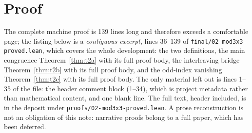 \documentclass[11pt]{article}
\begin{document}
\section{Proof}
The complete machine proof is 139 lines long and therefore exceeds a comfortable page; the
listing below is a \emph{contiguous excerpt}, lines 36--139 of
\texttt{final/02-mod3x3-proved.lean}, which covers the whole development: the two
definitions, the main congruence Theorem~\ref{thm:t2a} with its full proof body, the
interleaving bridge Theorem~\ref{thm:t2b} with its full proof body, and the odd-index
vanishing Theorem~\ref{thm:t2c} with its full proof body. The only material left out is lines
1--35 of the file: the header comment block (1--34), which is project metadata rather than
mathematical content, and one blank line. The full text, header included, is in the deposit
under \texttt{proofs/02-mod3x3-proved.lean}. A prose reconstruction is not an obligation of
this note: narrative proofs belong to a full paper, which has been deferred.
\end{document}
